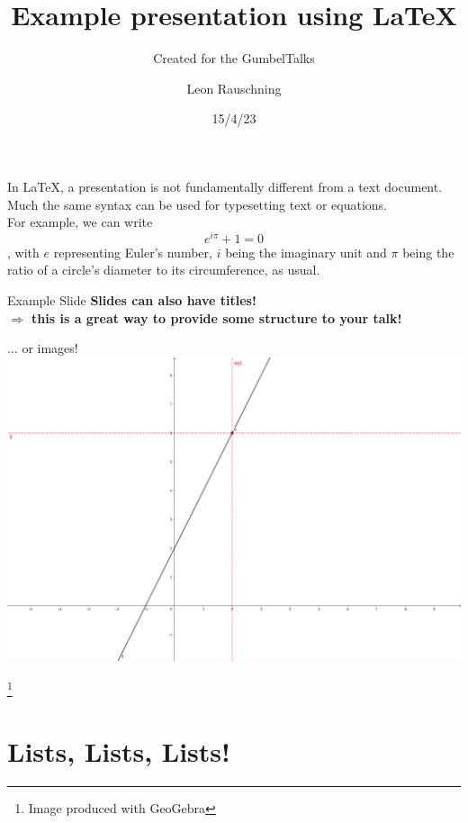 \documentclass[11pt]{beamer} %
\author{Leon Rauschning}
\title{Example presentation using \LaTeX}
\subtitle{Created for the GumbelTalks}
\date{15/4/23}
\newcommand\blfootnote[1]{
\begingroup
\renewcommand\thefootnote{}\footnote{#1}
\addtocounter{footnote}{-1}
\endgroup
}
\begin{document}
\begin{frame} %
	\maketitle %
\end{frame}

\begin{frame}
	In \LaTeX, a presentation is not fundamentally different from a text document.
	Much the same syntax can be used for typesetting text or equations.\\
	For example, we can write
	$$e^{i\pi} + 1 = 0$$
	, with $e$ representing Euler's number, $i$ being the imaginary unit and $\pi$ being the ratio of a circle's diameter to its circumference, as usual.
\end{frame}

\begin{frame}{Example Slide} %
	\centering
	\bf Slides can also have titles!\\
	$\Rightarrow$ \sf this is a great way to provide some structure to your talk!
\end{frame}

\begin{frame}{$\ldots$ or images!}
	\centering
	\includegraphics[width=.9\textwidth]{fig1-lineq.png} 
	\blfootnote{Image produced with GeoGebra} %
\end{frame}

\section*{Lists, Lists, Lists!} %
\end{document}

